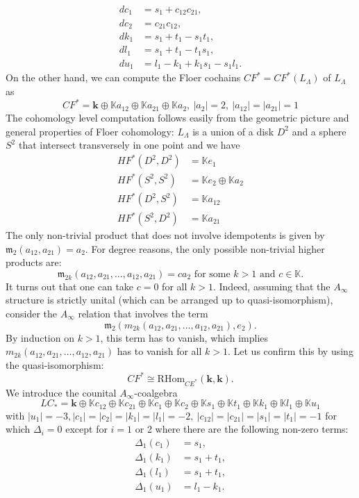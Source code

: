 \documentclass{gtpart}
\renewcommand{\k}{\mathbf{k}}
\newcommand{\K}{\mathbb{K}}
\newcommand{\m}{\mathfrak{m}}
\begin{document}
\begin{equation}
\begin{aligned} 
    dc_1 &= s_1 + c_{12}c_{21}, \\
    dc_2 &= c_{21} c_{12}, \\
    dk_1 &= s_1 +t_1 - s_1 t_1, \\
    dl_1 &= s_1 +t_1  - t_1 s_1, \\
    du_1 &= l_1 -k_1 + k_1 s_1 - s_1 l_1. 
\end{aligned}
\end{equation}
On the other hand, we can compute the Floer cochains $CF^{\ast}=CF^{\ast}(L_{\Lambda})$ of $L_\Lambda$ as 
\[ CF^* = \k \oplus \mathbb{K} a_{12} \oplus \K a_{21} \oplus \K a_2, \
|a_{2}|=2,\ |a_{12}|=|a_{21}|=1 \] 
The cohomology level
computation follows easily from the geometric picture and general properties of Floer cohomology:  $L_\Lambda$ is a union of a disk $D^2$ and
a sphere $S^2$ that intersect transversely in one point and we have
\begin{align*}
    HF^*(D^2,D^2) &= \K e_1 \\
    HF^*(S^2,S^2) &= \K e_2 \oplus \K a_2 \\
    HF^*(D^2,S^2) &= \K a_{12} \\
    HF^*(S^2,D^2) &= \K a_{21} 
\end{align*}
The only non-trivial product that does not involve idempotents is given by $\m_2(a_{12},a_{21}) = a_2$. For degree reasons, the only possible non-trivial higher products are:
\[ \m_{2k} (a_{12},a_{21}, \ldots, a_{12},a_{21}) = ca_2  \text{\ for some  } k >1 \text{ and } c
\in \K.\]
It turns out that one can take $c=0$ for all $k>1$. Indeed, assuming that the $A_\infty$ structure
is strictly unital (which can be arranged up to quasi-isomorphism), consider the $A_\infty$ relation that involves the term
\[ \m_2( m_{2k}(a_{12},a_{21},\ldots,a_{12},a_{21}), e_2). \]
By induction on $k>1$, this term has to vanish, which implies
$m_{2k}(a_{12},a_{21},\ldots,a_{12},a_{21})$ has to vanish for all $k>1$. Let us confirm this by
using the quasi-isomorphism:
\[ CF^*  \cong \mathrm{RHom}_{CE^*}(\k,\k).\] 
We introduce the counital $A_\infty$-coalgebra
\[ LC_* = \k \oplus \mathbb{K} c_{12} \oplus \K
c_{21} \oplus \K c_{1} \oplus \K c_{2} \oplus \K s_1 \oplus \K t_1 \oplus \K k_1 \oplus \K l_1
\oplus \K u_1 \] 
with $|u_1|=-3, |c_{1}|=|c_{2}| = |k_1|= |l_1|=  -2,\ |c_{12}|=|c_{21}|=|s_1|=|t_1|=-1$ 
for which $\Delta_{i}=0$ except for $i=1$ or 2 where there are the following non-zero terms:  
\begin{align*} 
    \Delta_1 (c_1) &= s_1, \\
    \Delta_1 (k_1) &= s_1 + t_1, \\
    \Delta_1 (l_1) &= s_1 + t_1, \\
    \Delta_1 (u_1) &= l_1 - k_1.
\end{align*}
\end{document}
